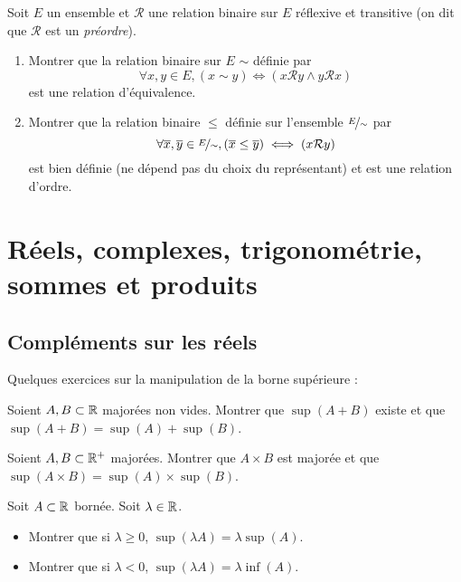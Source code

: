 \documentclass[12pt,a4paper]{exo_book}
\begin{document}
\begin{exo}
    Soit $E$ un ensemble et $\mathcal{R}$ une relation binaire sur $E$ réflexive et transitive (on dit que $\mathcal{R}$ est un \emph{préordre}).
    \begin{enumerate}
        \item Montrer que la relation binaire sur $E$ $\sim$ définie par
        \[\forall x,y\in E, (x \sim y) \iff (x\mathcal{R}y \wedge y \mathcal{R}x)\]
        est une relation d'équivalence.
        \item Montrer que la relation binaire $\le$ définie sur l'ensemble $\nicefrac{E}{\sim}$ par
        \[\forall \overline{x},\overline{y} \in \nicefrac{E}{\sim}, (\overline{x} \le \overline{y}) \iff (x\mathcal{R}y) \]
        est bien définie (ne dépend pas du choix du représentant) et est une relation d'ordre.
    \end{enumerate}
\end{exo}

\chapter{Réels, complexes, trigonométrie, sommes et produits}

\section{Compléments sur les réels}

Quelques exercices sur la manipulation de la borne supérieure :

\begin{exo}
    Soient $A,B \subset \mathbb{R}$ majorées non vides. Montrer que $\sup(A+B)$ existe et que $\sup(A+B) = \sup(A) + \sup(B)$.
\end{exo}

\begin{exo}
    Soient $A,B \subset \mathbb{R}^+$ majorées. Montrer que $A\times B$ est majorée et que $\sup(A\times B)=\sup(A)\times\sup(B)$.
\end{exo}

\begin{exo}
    Soit $A \subset \mathbb{R}$ bornée. Soit $\lambda \in \mathbb{R}$.
    \begin{itemize}
        \item Montrer que si $\lambda \ge 0$, $\sup (\lambda A) = \lambda \sup (A)$.
        \item Montrer que si $\lambda < 0$, $\sup (\lambda A) = \lambda \inf (A)$.
    \end{itemize}
\end{exo}
\end{document}
